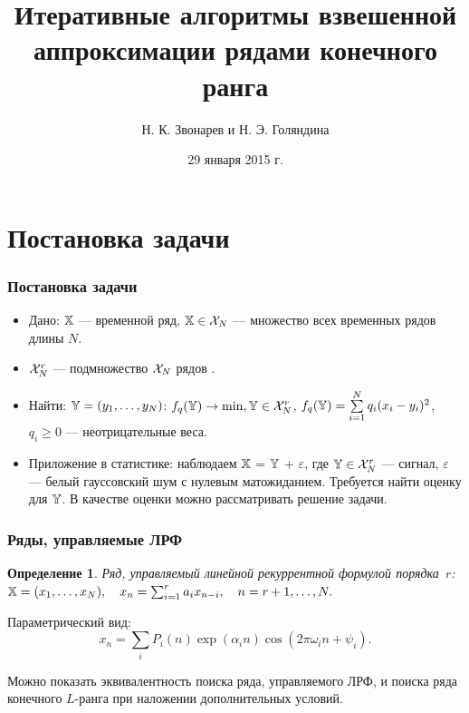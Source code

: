 \documentclass[unicode, notheorems]{beamer}
\title{Итеративные алгоритмы взвешенной аппроксимации рядами конечного ранга}
\author{Н. К. Звонарев и Н. Э. Голяндина}
\institute[СПбГУ]{Санкт-Петербургский государственный университет \\
}
\date{
    29 января 2015 г.
}
\newtheorem{definition}{Определение}
\begin{document}
\begin{frame}
    \titlepage
\end{frame}

\section{Постановка задачи}

\begin{frame}
    \frametitle{Постановка задачи}
    \begin{itemize}
    \item Дано: $\mathbb{X}$ --- временной ряд, $\mathbb{X} \in \mathcal{X}_N$ --- множество всех временных рядов длины $N$.
    \item $\mathcal{X}_N^r$ --- подмножество $\mathcal{X}_N$ рядов .
    \item Найти: $\mathbb{Y} = (y_1, \ldots, y_N)$: $f_q(\mathbb{Y}) \to \min, \mathbb{Y} \in \mathcal{X}_N^r$, $f_q(\mathbb{Y}) = \sum \limits_{i=1}^N q_i(x_i - y_i)^2$, $q_i \ge 0$ --- неотрицательные веса.
    \item Приложение в статистике: наблюдаем $\mathbb{X}$ = $\mathbb{Y}$ + $\varepsilon$, где $\mathbb{Y} \in \mathcal{X}_N^r$ --- сигнал, $\varepsilon$ --- белый гауссовский шум с нулевым матожиданием. Требуется найти оценку для $\mathbb{Y}$. В качестве оценки можно рассматривать решение задачи.
    \end{itemize}

\end{frame}

\begin{frame}
	\frametitle{Ряды, управляемые ЛРФ}
	\begin{definition}
		Ряд, управляемый линейной рекуррентной формулой порядка~$r$: $\mathbb{X} = (x_1, \ldots, x_N), \quad x_n = \sum_{i = 1}^{r} a_i x_{n-i}, \quad n = r + 1, \ldots, N.$
	\end{definition}
	Параметрический вид:
	\begin{equation*}
	x_n = \sum_i P_i(n) \exp(\alpha_i n) \cos(2 \pi \omega_i n + \psi_i).
	\end{equation*}
	
	Можно показать эквивалентность поиска ряда, управляемого ЛРФ, и поиска ряда конечного $L$-ранга при наложении дополнительных условий.
\end{frame}
\end{document}
